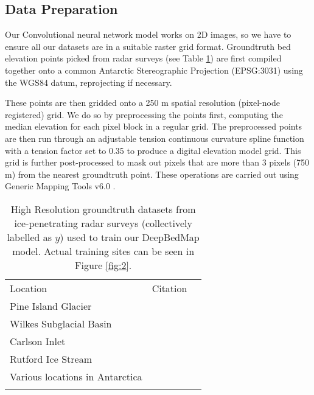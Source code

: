 \documentclass[tc, manuscript]{copernicus}
\begin{document}
\subsection{Data Preparation}

Our Convolutional neural network model works on 2D images, so we have to ensure all our datasets are in a suitable raster grid format.
Groundtruth bed elevation points picked from radar surveys (see Table \ref{table:groundtruthdata}) are first compiled together onto a common Antarctic Stereographic Projection (EPSG:3031) using the WGS84 datum, reprojecting if necessary.

These points are then gridded onto a 250 m spatial resolution (pixel-node registered) grid.
We do so by preprocessing the points first, computing the median elevation for each pixel block in a regular grid.
The preprocessed points are then run through an adjustable tension continuous curvature spline function with a tension factor set to 0.35 to produce a digital elevation model grid.
This grid is further post-processed to mask out pixels that are more than 3 pixels (750 m) from the nearest groundtruth point.
These operations are carried out using Generic Mapping Tools v6.0 \citep[GMT6,][]{WesselGenericMappingTools2019}.

\begin{table}[htbp]
  \caption{
    High Resolution groundtruth datasets from ice-penetrating radar surveys (collectively labelled as $y$) used to train our DeepBedMap model.
    Actual training sites can be seen in Figure \ref{fig:2}.
  }
  \label{table:groundtruthdata}
  \begin{tabular}{lcr}
  \tophline
  Location & Citation \\
  \middlehline
  Pine Island Glacier & \cite{BinghamDiverselandscapesPine2017} \\
  Wilkes Subglacial Basin & \cite{JordanHypothesismegaoutburstflooding2010} \\
  Carlson Inlet & \cite{KingIcestreamnot2011} \\
  Rutford Ice Stream & \cite{KingSubglaciallandformsRutford2016} \\
  Various locations in Antarctica & \cite{ShiMultichannelCoherentRadar2010} \\
  \bottomhline
  \end{tabular}
  \belowtable{} %
\end{table}
\end{document}
